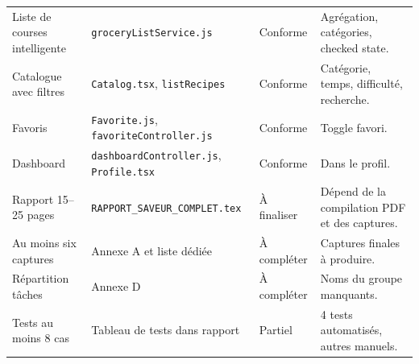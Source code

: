 \documentclass[12pt,a4paper]{article}
\begin{document}
\begin{longtable}{p{5cm}p{5.5cm}p{3cm}p{4cm}}
Liste de courses intelligente & \texttt{groceryListService.js} & Conforme & Agrégation, catégories, checked state. \\
Catalogue avec filtres & \texttt{Catalog.tsx}, \texttt{listRecipes} & Conforme & Catégorie, temps, difficulté, recherche. \\
Favoris & \texttt{Favorite.js}, \texttt{favoriteController.js} & Conforme & Toggle favori. \\
Dashboard & \texttt{dashboardController.js}, \texttt{Profile.tsx} & Conforme & Dans le profil. \\
Rapport 15--25 pages & \texttt{RAPPORT\_SAVEUR\_COMPLET.tex} & À finaliser & Dépend de la compilation PDF et des captures. \\
Au moins six captures & Annexe A et liste dédiée & À compléter & Captures finales à produire. \\
Répartition tâches & Annexe D & À compléter & Noms du groupe manquants. \\
Tests au moins 8 cas & Tableau de tests dans rapport & Partiel & 4 tests automatisés, autres manuels. \\
\bottomrule
\end{longtable}
\end{document}
